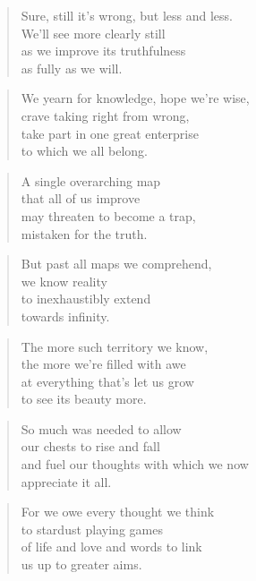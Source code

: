 \documentclass[10pt,a4paper]{article}
\begin{document}
\begin{paracol}{2}
\begin{verse}
Sure, still it’s wrong, but less and less.\\
We’ll see more clearly still\\
as we improve its truthfulness\\
as fully as we will.
\end{verse}

\begin{verse}
We yearn for knowledge, hope we’re wise,\\
crave taking right from wrong,\\
take part in one great enterprise\\
to which we all belong.
\end{verse}

\begin{verse}
A single overarching map\\
that all of us improve\\
may threaten to become a trap,\\
mistaken for the truth.
\end{verse}

\begin{verse}
But past all maps we comprehend,\\
we know reality\\
to inexhaustibly extend\\
towards infinity.
\end{verse}

\begin{verse}
The more such territory we know,\\
the more we’re filled with awe\\
at everything that’s let us grow\\
to see its beauty more.
\end{verse}

\begin{verse}
So much was needed to allow\\
our chests to rise and fall\\
and fuel our thoughts with which we now\\
appreciate it all.
\end{verse}

\begin{verse}
For we owe every thought we think\\
to stardust playing games\\
of life and love and words to link\\
us up to greater aims.
\end{verse}


\end{paracol}
\end{document}
